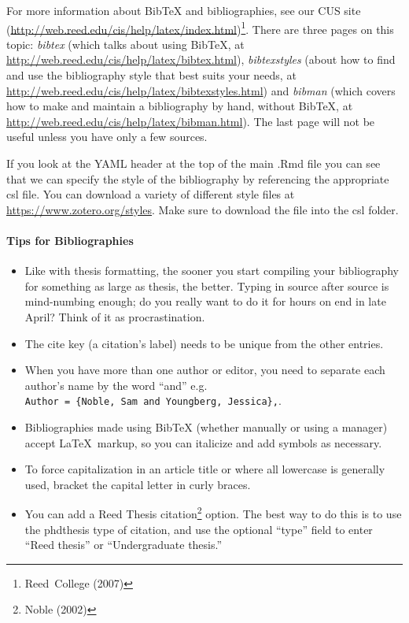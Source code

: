 \documentclass[12pt,twoside]{reedthesis}
\providecommand{\tightlist}{%
  \setlength{\itemsep}{0pt}\setlength{\parskip}{0pt}}
\begin{document}
  For more information about BibTeX and bibliographies, see our CUS site
  (\url{http://web.reed.edu/cis/help/latex/index.html})\footnote{Reed~College
    (2007)}. There are three pages on this topic: \emph{bibtex} (which
  talks about using BibTeX, at
  \url{http://web.reed.edu/cis/help/latex/bibtex.html}),
  \emph{bibtexstyles} (about how to find and use the bibliography style
  that best suits your needs, at
  \url{http://web.reed.edu/cis/help/latex/bibtexstyles.html}) and
  \emph{bibman} (which covers how to make and maintain a bibliography by
  hand, without BibTeX, at
  \url{http://web.reed.edu/cis/help/latex/bibman.html}). The last page
  will not be useful unless you have only a few sources.
  
  If you look at the YAML header at the top of the main .Rmd file you can
  see that we can specify the style of the bibliography by referencing the
  appropriate csl file. You can download a variety of different style
  files at \url{https://www.zotero.org/styles}. Make sure to download the
  file into the csl folder.
  
  \paragraph{Tips for Bibliographies}\label{tips-for-bibliographies-1}
  
  \begin{itemize}
  \tightlist
  \item
    Like with thesis formatting, the sooner you start compiling your
    bibliography for something as large as thesis, the better. Typing in
    source after source is mind-numbing enough; do you really want to do
    it for hours on end in late April? Think of it as procrastination.
  \item
    The cite key (a citation's label) needs to be unique from the other
    entries.
  \item
    When you have more than one author or editor, you need to separate
    each author's name by the word ``and'' e.g.
    \texttt{Author\ =\ \{Noble,\ Sam\ and\ Youngberg,\ Jessica\},}.
  \item
    Bibliographies made using BibTeX (whether manually or using a manager)
    accept \LaTeX~markup, so you can italicize and add symbols as
    necessary.
  \item
    To force capitalization in an article title or where all lowercase is
    generally used, bracket the capital letter in curly braces.
  \item
    You can add a Reed Thesis citation\footnote{Noble (2002)} option. The
    best way to do this is to use the phdthesis type of citation, and use
    the optional ``type'' field to enter ``Reed thesis'' or
    ``Undergraduate thesis.''
  \end{itemize}
  
\end{document}
